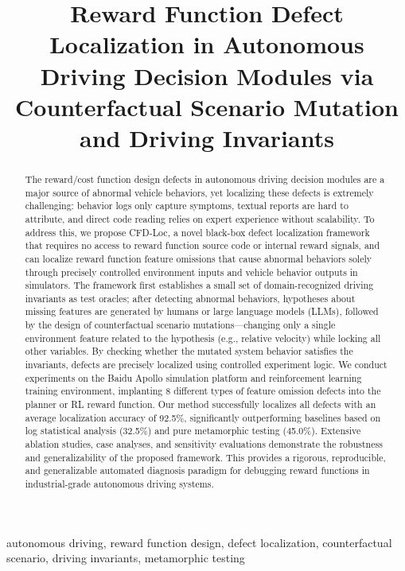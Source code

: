 \documentclass[conference]{IEEEtran}
\title{Reward Function Defect Localization in Autonomous Driving Decision Modules via Counterfactual Scenario Mutation and Driving Invariants}
\author{
\IEEEauthorblockN{Wenjia Niu}
\IEEEauthorblockA{School of Cyberspace Science and Technology \\
Beijing Jiaotong University\\
Beijing, China 100044 \\
Email: Niuwj@bjtu.edu.cn}
}
\theoremstyle{plain}
\newcommand{\methodname}{CFD-Loc}
\begin{document}
\maketitle

\begin{abstract}
The reward/cost function design defects in autonomous driving decision modules are a major source of abnormal vehicle behaviors, yet localizing these defects is extremely challenging: behavior logs only capture symptoms, textual reports are hard to attribute, and direct code reading relies on expert experience without scalability. To address this, we propose \methodname, a novel black-box defect localization framework that requires no access to reward function source code or internal reward signals, and can localize reward function feature omissions that cause abnormal behaviors solely through precisely controlled environment inputs and vehicle behavior outputs in simulators. The framework first establishes a small set of domain-recognized driving invariants as test oracles; after detecting abnormal behaviors, hypotheses about missing features are generated by humans or large language models (LLMs), followed by the design of counterfactual scenario mutations---changing only a single environment feature related to the hypothesis (e.g., relative velocity) while locking all other variables. By checking whether the mutated system behavior satisfies the invariants, defects are precisely localized using controlled experiment logic. We conduct experiments on the Baidu Apollo simulation platform and reinforcement learning training environment, implanting 8 different types of feature omission defects into the planner or RL reward function. Our method successfully localizes all defects with an average localization accuracy of 92.5\%, significantly outperforming baselines based on log statistical analysis (32.5\%) and pure metamorphic testing (45.0\%). Extensive ablation studies, case analyses, and sensitivity evaluations demonstrate the robustness and generalizability of the proposed framework. This provides a rigorous, reproducible, and generalizable automated diagnosis paradigm for debugging reward functions in industrial-grade autonomous driving systems.
\end{abstract}

\begin{IEEEkeywords}
autonomous driving, reward function design, defect localization, counterfactual scenario, driving invariants, metamorphic testing
\end{IEEEkeywords}
\end{document}
